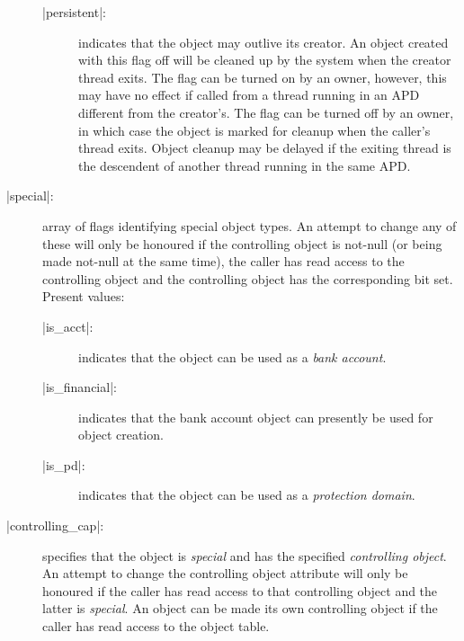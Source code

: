 \documentclass[a4paper,11pt,twoside,dvips]{report}
\begin{document}
\begin{description}
\begin{description}
\item[|persistent|:] indicates that the object may outlive its
creator. An object created with this flag off will be cleaned up by the
system when the creator thread exits. The flag can be
turned on by an owner, however, this may have no effect if called from a
thread running in an APD different from the creator's.
The flag can be turned off by an owner, in which case the object is
marked for cleanup when the caller's thread exits. Object
cleanup may be delayed if the exiting thread is the descendent of
another thread running in the same APD.
\end{description}
\item[|special|:] array of flags identifying special object
types. An attempt to change any of these will only be honoured if the
controlling object is not-null (or being made not-null at the same
time), the caller has read access to the controlling object and the
controlling object has the corresponding bit set. Present values:
\begin{description}
\item[|is\_acct|:] indicates that the object can be used as a \emph{bank
account}.
\item[|is\_financial|:] indicates that the bank account object can
presently be used for object creation.
\item[|is\_pd|:] indicates that the object can be used as a
\emph{protection domain}.

\end{description}
\item[|controlling\_cap|:] specifies that the object is \emph{special}
and has the specified \emph{controlling object}. An attempt to change
the controlling object attribute will only be honoured if the caller has
read access to that controlling object and the latter is
\emph{special}. An object can be made its own controlling object if the
caller has read access to the object table.
\end{description}
\end{document}
